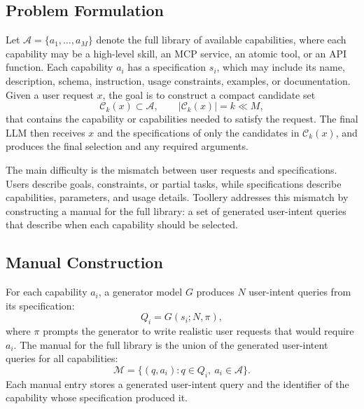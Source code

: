 \documentclass[11pt]{article}
\begin{document}
\subsection{Problem Formulation}
\label{subsec:problem-formulation}

Let $\mathcal{A}=\{a_1,\ldots,a_M\}$ denote the full library of available capabilities, where each capability may be a high-level skill, an MCP service, an atomic tool, or an API function. Each capability $a_i$ has a specification $s_i$, which may include its name, description, schema, instruction, usage constraints, examples, or documentation. Given a user request $x$, the goal is to construct a compact candidate set
\begin{equation}
    \mathcal{C}_k(x)\subset\mathcal{A},\qquad |\mathcal{C}_k(x)|=k\ll M,
\end{equation}
that contains the capability or capabilities needed to satisfy the request. The final LLM then receives $x$ and the specifications of only the candidates in $\mathcal{C}_k(x)$, and produces the final selection and any required arguments.

The main difficulty is the mismatch between user requests and specifications. Users describe goals, constraints, or partial tasks, while specifications describe capabilities, parameters, and usage details. Toollery addresses this mismatch by constructing a manual for the full library: a set of generated user-intent queries that describe when each capability should be selected.

\subsection{Manual Construction}
\label{subsec:intent-index}

For each capability $a_i$, a generator model $G$ produces $N$ user-intent queries from its specification:
\begin{equation}
    Q_i = G(s_i; N, \pi),
\end{equation}
where $\pi$ prompts the generator to write realistic user requests that would require $a_i$. The manual for the full library is the union of the generated user-intent queries for all capabilities:
\begin{equation}
    \mathcal{M}=\{(q,a_i): q\in Q_i,\ a_i\in\mathcal{A}\}.
\end{equation}
Each manual entry stores a generated user-intent query and the identifier of the capability whose specification produced it.
\end{document}
